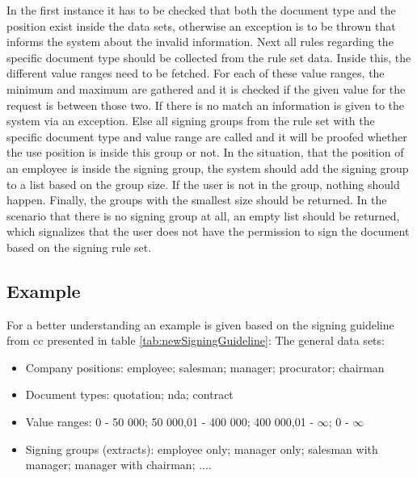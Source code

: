 In the first instance it has to be checked that both the document type and the position exist inside the data sets, otherwise an exception is to be thrown that informs the system about the invalid information. Next all rules regarding the specific document type should be collected from the rule set data. Inside this, the different value ranges need to be fetched. For each of these value ranges, the minimum and maximum are gathered and it is checked if the given value for the request is between those two. If there is no match an information is given to the system via an exception. Else all signing groups from the rule set with the specific document type and value range are called and it will be proofed whether the use position is inside this group or not. In the situation, that the position of an employee is inside the signing group, the system should add the signing group to a list based on the group size. If the user is not in the group, nothing should happen. Finally, the groups with the smallest size should be returned. In the scenario that there is no signing group at all, an empty list should be returned, which signalizes that the user does not have the permission to sign the document based on the signing rule set. 

\subsection*{Example}
For a better understanding an example is given based on the signing guideline from \gls{cc} presented in table \ref{tab:newSigningGuideline}: \newline
The general data sets:
\begin{itemize}
	\item Company positions: employee; salesman; manager; procurator; chairman
	\item Document types: quotation; \gls{nda}; contract
	\item Value ranges: 0 - 50 000; 50 000,01 - 400 000; 400 000,01 - $\infty$; 0 - $\infty$
	\item Signing groups (extracts): employee only; manager only; salesman with manager; manager with chairman; ....
\end{itemize}

